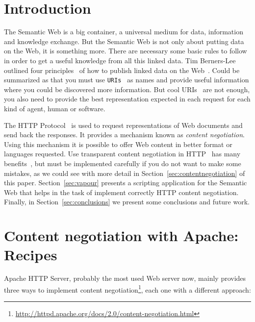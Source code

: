 
\section{Introduction}

The Semantic Web is a big container, a universal medium for data, information
and knowledge exchange. But the Semantic Web is not only about putting data on
the Web, it is something more. There are necessary some basic rules to follow
in order to get a useful knowledge from all this linked data. Tim Berners-Lee 
outlined four principles~\cite{TimBL2006} of how to publish linked data on the 
Web~\cite{PublishLinkedData2007}. Could be summarized as that you must use 
\texttt{URIs}~\cite{RFC3986} as names and provide useful information where you 
could be discovered more information. But cool URIs~\cite{Sauermann2007} are 
not enough, you also need to provide the best representation expected in each
request for each kind of agent, human or software.

The HTTP Protocol~\cite{HTTP} is used to request representations of Web documents
and send back the responses. It provides a mechanism known as \textit{content negotiation}.
Using this mechanism it is possible to offer Web content in better format or 
languages requested. Use transparent content negotiation in HTTP~\cite{Holtman1998} 
has many benefits~\cite{Seshan1998}, but must be implemented carefully if you do 
not want to make some mistakes, as we could see with more detail in 
Section~\ref{sec:contentnegotiation} of this paper. Section~\ref{sec:vapour} presents 
a scripting application for the Semantic Web that helps in the task of implement 
correctly HTTP content negotiation. Finally, in Section~\ref{sec:conclusions} 
we present some conclusions and future work.


\section{\label{sec:contentnegotiation}Content negotiation with Apache: Recipes}


Apache HTTP Server, probably the most used Web server now, mainly provides three ways 
to implement content negotiation\footnote{\url{http://httpd.apache.org/docs/2.0/content-negotiation.html}}, 
each one with a different approach:

